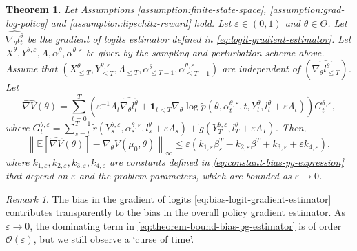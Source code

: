 \documentclass[11pt]{article}
\numberwithin{equation}{section}
\newtheorem{theorem}{Theorem}[section]
\theoremstyle{definition}
\theoremstyle{remark}
\newtheorem{remark}{Remark}[section]
\def\eps{\varepsilon}
\begin{document}
\begin{theorem}
\label{theorem:main-bias-result}
Let Assumptions \ref{assumption:finite-state-space}, \ref{assumption:grad-log-policy} and \ref{assumption:lipschitz-reward} hold.
Let $\eps \in (0,1)$ and $\theta \in \Theta$.
Let $\widehat{\nabla_\theta l_t^\theta}$ be the gradient of logits estimator defined in \eqref{eq:logit-gradient-estimator}.
Let $X^\theta, Y^{\theta, \eps}, \Lambda, \alpha^{\theta}, \alpha^{\theta, \eps}$ be given by the sampling and perturbation scheme above.
Assume that $(X_{\leq T}^\theta,Y_{\leq T}^{\theta, \eps},\Lambda_{\leq T}, \alpha^{\theta}_{\leq T - 1}, \alpha^{\theta, \eps}_{\leq T - 1})$ are independent of $(\widehat{\nabla_\theta l_{\leq T}^\theta})$.
Let 
\begin{equation}
    \label{eq:policy-gradient-estimator}
    \widehat{\nabla V}(\theta) = \sum_{t=0}^{T} \left(\eps^{-1} \Lambda_t \widehat{\nabla_\theta l^\theta_t} + \mathbf 1 _{t < T}\nabla_\theta \log \tilde p (\theta, \alpha_t^{\theta, \eps}, t,Y_t^\theta, l_t^\theta + \eps \Lambda_t) \right)G_t^{\theta, \eps}, 
\end{equation}
where $G_t^{\theta, \eps} = \sum_{s=t}^{T-1} \tilde r(Y_s^{\theta, \eps}, \alpha_s^{\theta, \eps}, l^\theta_s + \eps \Lambda_s) + \tilde g(Y_T^{\theta, \eps}, l_T^\theta + \eps \Lambda_T)$.
Then, 
\begin{equation}
    \label{eq:theorem-bound-bias-pg-estimator}
    \left\| \mathbb E \left[\widehat{\nabla V}(\theta) \right] - \nabla_\theta V (\mu_0, \theta)\right\|_\infty \leq \eps \left(k_{1,\eps} \beta_\eps^T - k_{2,\eps} \beta^T + k_{3, \eps} + \eps k_{4,\eps}\right),
\end{equation}
where $k_{1, \eps}, k_{2, \eps}, k_{3, \eps}, k_{4, \eps}$ are constants defined in \eqref{eq:constant-bias-pg-expression} that depend on $\eps$ and the problem parameters, which are bounded as $\eps \to 0$.
\end{theorem}

\begin{remark}
    The bias in the gradient of logits \eqref{eq:bias-logit-gradient-estimator} contributes transparently to the bias in the overall policy gradient estimator. As $\eps \to 0$, the dominating term in \eqref{eq:theorem-bound-bias-pg-estimator} is of order $\mathcal O (\eps)$, but we still observe a `curse of time'.
\end{remark}
\end{document}
